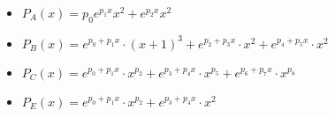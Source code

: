 \begin{itemize}
	\item $P_A(x) = p_0 e^{p_1x}x^2 + e^{p_2x}x^2$
	\item $P_B(x) = e^{p_0 + p_1x} \cdot (x + 1)^3 + e^{p_2 + p_3x} \cdot x^2 + e^{p_4 + p_5x} \cdot x^2$
	\item $P_C(x) = e^{p_0 + p_1x} \cdot x^{p_2} + e^{p_3 + p_4x} \cdot x^{p_5} + e^{p_6 + p_7x} \cdot x^{p_8}$
	\item $P_E(x) = e^{p_0 + p_1x} \cdot x^{p_2} + e^{p_3 + p_4x} \cdot x^2$
\end{itemize}

%
%
%
%
%


